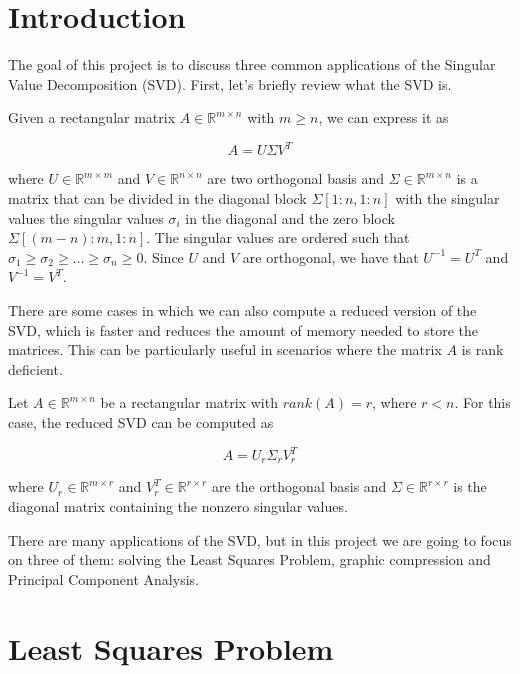\documentclass[11pt,a4paper]{article}
\begin{document}
\tableofcontents
\thispagestyle{empty}				%

\newpage

\setlength{\parskip}{1em}
\setlength{\parindent}{0pt}

\section{Introduction}

The goal of this project is to discuss three common applications of the Singular Value
Decomposition (SVD). First, let's briefly review what the SVD is.

Given a rectangular matrix $A \in \mathbb{R}^{m \times n}$ with $m \geq n$, we can express
it as

\[
  A = U \Sigma V^T
\]

where $U \in \mathbb{R}^{m \times m}$ and $V \in \mathbb{R}^{n \times n}$ are two orthogonal basis
and $\Sigma \in \mathbb{R}^{m \times n}$ is a matrix that can be divided in the diagonal block
$\Sigma\left[1:n, 1:n\right]$ with the singular values the singular values $\sigma_i$ in the diagonal
and the zero block $\Sigma\left[(m-n):m, 1:n\right]$. The singular values are ordered such that
$\sigma_1 \geq \sigma_2 \geq \dots \geq \sigma_n \geq 0$. Since $U$ and $V$ are orthogonal, we have
that $U^{-1} = U^T$ and $V^{-1} = V^T$.

There are some cases in which we can also compute a reduced version of the SVD, which is faster and
reduces the amount of memory needed to store the matrices. This can be particularly useful in scenarios
where the matrix $A$ is rank deficient.

Let $A \in \mathbb{R}^{m \times n}$ be a rectangular matrix with $rank(A) = r$, where $r < n$. For this
case, the reduced SVD can be computed as

\[
  A = U_r \Sigma_r V_r^T
\]

where $U_r \in \mathbb{R}^{m \times r}$ and $V_r^T \in \mathbb{R}^{r \times r}$ are the orthogonal
basis and $\Sigma \in \mathbb{R}^{r \times r}$ is the diagonal matrix containing the nonzero
singular values.

There are many applications of the SVD, but in this project we are going to focus on three of them:
solving the Least Squares Problem, graphic compression and Principal Component Analysis.

\section{Least Squares Problem}
\end{document}
